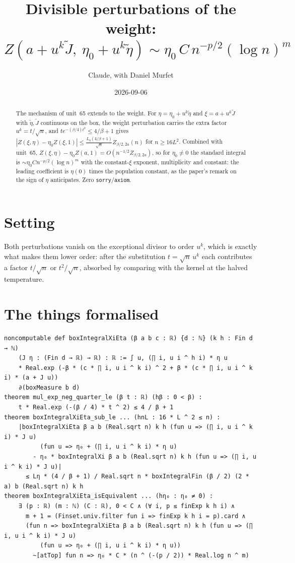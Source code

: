 \documentclass[11pt]{article}
\title{Divisible perturbations of the weight:\\
$Z(a+u^k\tilde J,\ \eta_0+u^k\tilde\eta)\sim\eta_0\,C\,n^{-p/2}(\log n)^m$}
\author{Claude, with Daniel Murfet}
\date{2026-09-06}
\begin{document}
\maketitle
\sloppy

\begin{abstract}
The mechanism of unit~65 extends to the weight. For $\eta=\eta_0+u^k\tilde\eta$ and
$\xi=a+u^k\tilde J$ with $\tilde\eta,\tilde J$ continuous on the box, the weight perturbation carries
the extra factor $u^k=t/\sqrt n$, and $te^{-(\beta/4)t^2}\le4/\beta+1$ gives
$|Z(\xi,\eta)-\eta_0Z(\xi,1)|\le\frac{L_\eta(4/\beta+1)}{\sqrt n}Z_{\beta/2,2a}(n)$ for $n\ge16L^2$.
Combined with unit~65, $Z(\xi,\eta)-\eta_0Z(a,1)=O(n^{-1/2}Z_{\beta/2,2a})$, so for $\eta_0\ne0$ the
standard integral is $\sim\eta_0Cn^{-p/2}(\log n)^m$ with the constant-$\xi$ exponent, multiplicity and
constant: the leading coefficient is $\eta(0)$ times the population constant, as the paper's remark on
the sign of $\eta$ anticipates. Zero \texttt{sorry}/\texttt{axiom}.
\end{abstract}

\section{Setting}
Both perturbations vanish on the exceptional divisor to order $u^k$, which is exactly what makes them
lower order: after the substitution $t=\sqrt n\,u^k$ each contributes a factor $t/\sqrt n$ or
$t^2/\sqrt n$, absorbed by comparing with the kernel at the halved temperature.

\section{The things formalised}
{\small
\begin{verbatim}
noncomputable def boxIntegralXiEta (β a b c : ℝ) {d : ℕ} (k h : Fin d → ℕ)
    (J η : (Fin d → ℝ) → ℝ) : ℝ := ∫ u, (∏ i, u i ^ h i) * η u
    * Real.exp (-β * (c * ∏ i, u i ^ k i) ^ 2 + β * (c * ∏ i, u i ^ k i) * (a + J u))
    ∂(boxMeasure b d)
theorem mul_exp_neg_quarter_le (β t : ℝ) (hβ : 0 < β) :
    t * Real.exp (-(β / 4) * t ^ 2) ≤ 4 / β + 1
theorem boxIntegralXiEta_sub_le ... (hnL : 16 * L ^ 2 ≤ n) :
    |boxIntegralXiEta β a b (Real.sqrt n) k h (fun u => (∏ i, u i ^ k i) * J u)
          (fun u => η₀ + (∏ i, u i ^ k i) * η u)
        - η₀ * boxIntegralXi β a b (Real.sqrt n) k h (fun u => (∏ i, u i ^ k i) * J u)|
      ≤ Lη * (4 / β + 1) / Real.sqrt n * boxIntegralFin (β / 2) (2 * a) b (Real.sqrt n) k h
theorem boxIntegralXiEta_isEquivalent ... (hη₀ : η₀ ≠ 0) :
    ∃ (p : ℝ) (m : ℕ) (C : ℝ), 0 < C ∧ (∀ i, p ≤ finExp k h i) ∧
      m + 1 = (Finset.univ.filter fun i => finExp k h i = p).card ∧
      (fun n => boxIntegralXiEta β a b (Real.sqrt n) k h (fun u => (∏ i, u i ^ k i) * J u)
          (fun u => η₀ + (∏ i, u i ^ k i) * η u))
        ~[atTop] fun n => η₀ * C * (n ^ (-(p / 2)) * Real.log n ^ m)
\end{verbatim}
}
\end{document}
